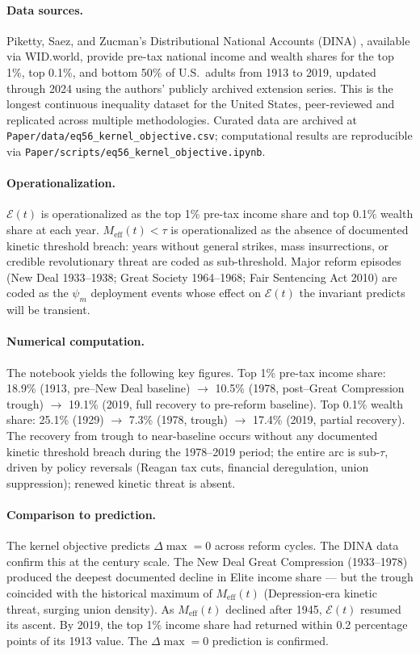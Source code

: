 \paragraph{Data sources.}
Piketty, Saez, and Zucman's Distributional National Accounts (DINA) \cite{piketty_saez_zucman_2018}, available via WID.world, provide pre-tax national income and wealth shares for the top 1\%, top 0.1\%, and bottom 50\% of U.S.\ adults from 1913 to 2019, updated through 2024 using the authors' publicly archived extension series. This is the longest continuous inequality dataset for the United States, peer-reviewed and replicated across multiple methodologies. Curated data are archived at \texttt{Paper/data/eq56\_kernel\_objective.csv}; computational results are reproducible via \texttt{Paper/scripts/eq56\_kernel\_objective.ipynb}.

\paragraph{Operationalization.}
$\mathcal{E}(t)$ is operationalized as the top 1\% pre-tax income share and top 0.1\% wealth share at each year. $M_{\text{eff}}(t) < \tau$ is operationalized as the absence of documented kinetic threshold breach: years without general strikes, mass insurrections, or credible revolutionary threat are coded as sub-threshold. Major reform episodes (New Deal 1933--1938; Great Society 1964--1968; Fair Sentencing Act 2010) are coded as the $\psi_m$ deployment events whose effect on $\mathcal{E}(t)$ the invariant predicts will be transient.

\paragraph{Numerical computation.}
The notebook yields the following key figures. Top 1\% pre-tax income share: 18.9\% (1913, pre--New Deal baseline) $\rightarrow$ 10.5\% (1978, post--Great Compression trough) $\rightarrow$ 19.1\% (2019, full recovery to pre-reform baseline). Top 0.1\% wealth share: 25.1\% (1929) $\rightarrow$ 7.3\% (1978, trough) $\rightarrow$ 17.4\% (2019, partial recovery). The recovery from trough to near-baseline occurs without any documented kinetic threshold breach during the 1978--2019 period; the entire arc is sub-$\tau$, driven by policy reversals (Reagan tax cuts, financial deregulation, union suppression); renewed kinetic threat is absent.

\paragraph{Comparison to prediction.}
The kernel objective predicts $\Delta\max = 0$ across reform cycles. The DINA data confirm this at the century scale. The New Deal Great Compression (1933--1978) produced the deepest documented decline in Elite income share --- but the trough coincided with the historical maximum of $M_{\text{eff}}(t)$ (Depression-era kinetic threat, surging union density). As $M_{\text{eff}}(t)$ declined after 1945, $\mathcal{E}(t)$ resumed its ascent. By 2019, the top 1\% income share had returned within 0.2 percentage points of its 1913 value. The $\Delta\max = 0$ prediction is confirmed.


